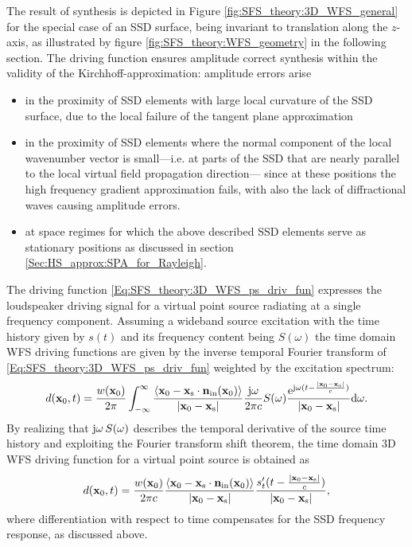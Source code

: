 The result of synthesis is depicted in Figure \ref{fig:SFS_theory:3D_WFS_general} for the special case of an SSD surface, being invariant to translation along the $z$-axis, as illustrated by figure \ref{fig:SFS_theory:WFS_geometry} in the following section.
The driving function ensures amplitude correct synthesis within the validity of the Kirchhoff-approximation:
amplitude errors arise 
\begin{itemize}
\item in the proximity of SSD elements with large local curvature of the SSD surface, due to the local failure of the tangent plane approximation
\item in the proximity of SSD elements where the normal component of the local wavenumber vector is small---i.e. at parts of the SSD that are nearly parallel to the local virtual field propagation direction--- since at these positions the high frequency gradient approximation fails, with also the lack of diffractional waves causing amplitude errors.
\item at space regimes for which the above described SSD elements serve as stationary positions as discussed in section \ref{Sec:HS_approx:SPA_for_Rayleigh}.
\end{itemize}

The driving function \eqref{Eq:SFS_theory:3D_WFS_ps_driv_fun} expresses the loudspeaker driving signal for a virtual point source radiating at a single frequency component.
Assuming a wideband source excitation with the time history given by $s(t)$ and its frequency content being $S(\omega)$ the time domain WFS driving functions are given by the inverse temporal Fourier transform of \eqref{Eq:SFS_theory:3D_WFS_ps_driv_fun} weighted by the excitation spectrum:
\begin{equation}
d(\mathbf{x}_0,t) = \frac{w(\mathbf{x}_0)}{2\pi} \int_{-\infty}^{\infty} \frac{\left< \mathbf{x}_0-\mathbf{x}_{\mathrm{s}} \cdot \mathbf{n}_{\mathrm{in}}(\mathbf{x}_0) \right> }{|\mathbf{x}_0-\mathbf{x}_{\mathrm{s}}|} \frac{\mathrm{j} \omega }{2\pi c} S(\omega) \frac{\mathrm{e}^{ \mathrm{j} \omega ( t - \frac{|\mathbf{x}_0-\mathbf{x}_{\mathrm{s}}|}{c} ) }}{|\mathbf{x}_0-\mathbf{x}_{\mathrm{s}}|} 
\mathrm{d} \omega.
\end{equation}
By realizing that $\mathrm{j} \omega \, S(\omega)$ describes the temporal derivative of the source time history and exploiting the Fourier transform shift theorem, the time domain 3D WFS driving function for a virtual point source is obtained as
\begin{equation}
\label{Eq:SFS_theory:3D_WFS_ps_driv_fun_td}
d(\mathbf{x}_0,t) = \frac{w(\mathbf{x}_0)}{2\pi c} \frac{\left< \mathbf{x}_0-\mathbf{x}_{\mathrm{s}} \cdot \mathbf{n}_{\mathrm{in}}(\mathbf{x}_0) \right> }{|\mathbf{x}_0-\mathbf{x}_{\mathrm{s}}|} \frac{s'_t(t - \frac{|\mathbf{x}_0-\mathbf{x}_{\mathrm{s}}|}{c} )}{|\mathbf{x}_0-\mathbf{x}_{\mathrm{s}}|},
\end{equation}
where differentiation with respect to time compensates for the SSD frequency response, as discussed above.

